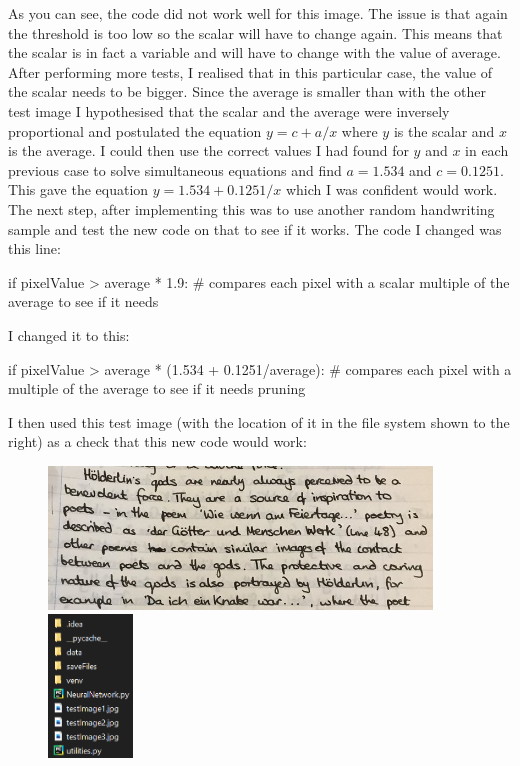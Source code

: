 \documentclass{report}
\begin{document}
\noindent As you can see, the code did not work well for this image. The issue is that again the threshold is too low so the scalar will have to change again. This means that the scalar is in fact a variable and will have to change with the value of average.
\newline
After performing more tests, I realised that in this particular case, the value of the scalar needs to be bigger. Since the average is smaller than with the other test image I hypothesised that the scalar and the average were inversely proportional and postulated the equation $y = c + a/x$ where $y$ is the scalar and $x$ is the average. I could then use the correct values I had found for $y$ and $x$ in each previous case to solve simultaneous equations and find $a = 1.534$ and $c = 0.1251$. This gave the equation $y = 1.534 + 0.1251/x$ which I was confident would work. 
\newline
The next step, after implementing this was to use another random handwriting sample and test the new code on that to see if it works. The code I changed was this line:
\begin{python}
if pixelValue > average * 1.9:  # compares each pixel with a scalar multiple of the average to see if it needs
\end{python}
I changed it to this:
\begin{python}
if pixelValue > average * (1.534 + 0.1251/average):  # compares each pixel with a multiple of the average to see if it needs pruning
\end{python}
I then used this test image (with the location of it in the file system shown to the right) as a check that this new code would work:
\begin{figure}[H]
    \centering
    \includegraphics[height=1.5in]{Images/Development and Testing/Stage 4/Testing for Clean Image/testImage3.jpg}
    \includegraphics[height=1.5in]{Images/Development and Testing/Stage 4/Testing for Clean Image/ProofOfTestImage3.png}
    \label{fig:Test Image 3 and location}
\end{figure}
\end{document}
